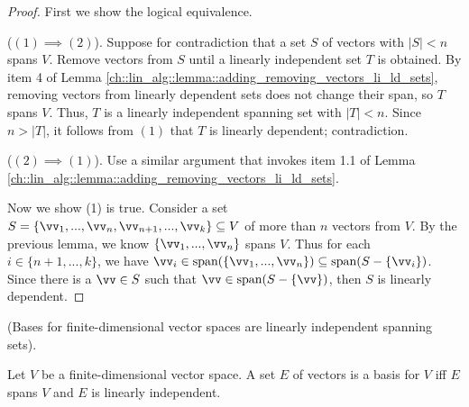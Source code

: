\begin{proof}
    First we show the logical equivalence.
    
    ($(1) \implies (2)$). Suppose for contradiction that a set $S$ of vectors with $|S| < n$ spans $V$. Remove vectors from $S$ until a linearly independent set $T$ is obtained. By item 4 of Lemma \ref{ch::lin_alg::lemma::adding_removing_vectors_li_ld_sets}, removing vectors from linearly dependent sets does not change their span, so $T$ spans $V$. Thus, $T$ is a linearly independent spanning set with $|T| < n$. Since $n > |T|$, it follows from $(1)$ that $T$ is linearly dependent; contradiction.
    
    ($(2) \implies (1)$). Use a similar argument that invokes item 1.1 of Lemma \ref{ch::lin_alg::lemma::adding_removing_vectors_li_ld_sets}.

    Now we show (1) is true. Consider a set $S = \{\vv_1, ..., \vv_n, \vv_{n + 1}, ..., \vv_k\} \subseteq V$ of more than $n$ vectors from $V$. By the previous lemma, we know $\{\vv_1, ..., \vv_n\}$ spans $V$. Thus for each $i \in \{n + 1, ..., k\}$, we have ${\vv_i \in \spann(\{\vv_1, ..., \vv_n\}) \subseteq \spann(S - \{\vv_i\})}$. Since there is a $\vv \in S$ such that $\vv \in \spann(S - \{\vv\})$, then $S$ is linearly dependent.   
\end{proof}

\begin{theorem}
    (Bases for finite-dimensional vector spaces are linearly independent spanning sets).
    
    Let $V$ be a finite-dimensional vector space. A set $E$ of vectors is a basis for $V$ iff $E$ spans $V$ and $E$ is linearly independent.
\end{theorem}

